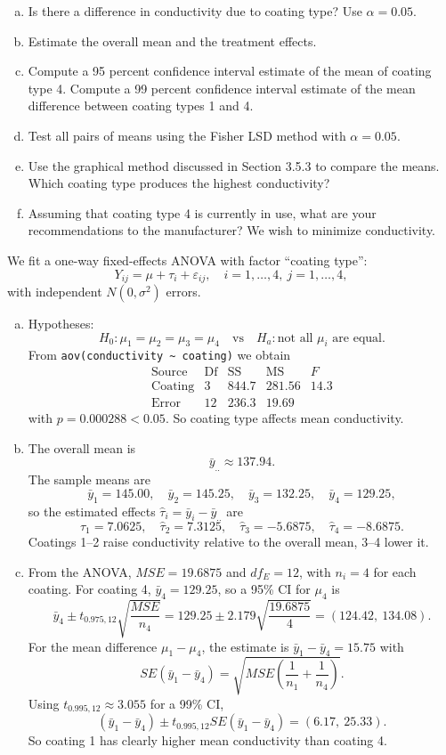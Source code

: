\documentclass[answers,12pt,addpoints]{exam}
\begin{document}
\begin{questions}
\begin{enumerate}[(a)]
\item Is there a difference in conductivity due to coating type? Use $\alpha = 0.05$.
\item Estimate the overall mean and the treatment effects.
\item Compute a 95 percent confidence interval estimate of the mean of coating type 4. Compute a 99 percent confidence interval estimate of the mean difference between coating types 1 and 4.
\item Test all pairs of means using the Fisher LSD method with $\alpha = 0.05$.
\item Use the graphical method discussed in Section 3.5.3 to compare the means. Which coating type produces the highest conductivity?
\item Assuming that coating type 4 is currently in use, what are your recommendations to the manufacturer? We wish to minimize conductivity.
\end{enumerate}

\begin{solution}
We fit a one-way fixed-effects ANOVA with factor “coating type”:
\[
Y_{ij} = \mu + \tau_i + \varepsilon_{ij},\quad i=1,\dots,4,\ j=1,\dots,4,
\]
with independent $N(0,\sigma^2)$ errors.

\begin{enumerate}[(a)]
\item Hypotheses:
\[
H_0:\mu_1=\mu_2=\mu_3=\mu_4
\quad\text{vs}\quad
H_a:\text{not all }\mu_i\text{ are equal}.
\]
From \verb|aov(conductivity ~ coating)| we obtain
\[
\begin{array}{l|rrrr}
\text{Source} & \text{Df} & \text{SS} & \text{MS} & F \\
\hline
\text{Coating} & 3 & 844.7 & 281.56 & 14.3 \\
\text{Error}   & 12& 236.3 & 19.69 &
\end{array}
\]
with $p = 0.000288 < 0.05$. So coating type affects mean conductivity.

\item The overall mean is
\[
\bar y_{..} \approx 137.94.
\]
The sample means are
\[
\bar y_1=145.00,\quad \bar y_2=145.25,\quad \bar y_3=132.25,\quad \bar y_4=129.25,
\]
so the estimated effects $\hat\tau_i = \bar y_i-\bar y_{..}$ are
\[
\hat\tau_1=7.0625,\quad \hat\tau_2=7.3125,\quad \hat\tau_3=-5.6875,\quad \hat\tau_4=-8.6875.
\]
Coatings 1–2 raise conductivity relative to the overall mean, 3–4 lower it.

\item From the ANOVA, $MSE=19.6875$ and $df_E=12$, with $n_i=4$ for each coating.
For coating 4, $\bar y_4=129.25$, so a 95\% CI for $\mu_4$ is
\[
\bar y_4 \pm t_{0.975,12}\sqrt{\frac{MSE}{n_4}}
= 129.25 \pm 2.179\sqrt{\frac{19.6875}{4}}
= (124.42,\ 134.08).
\]
For the mean difference $\mu_1-\mu_4$, the estimate is $\bar y_1-\bar y_4=15.75$ with
\[
SE(\bar y_1-\bar y_4) = \sqrt{MSE\left(\frac{1}{n_1}+\frac{1}{n_4}\right)}.
\]
Using $t_{0.995,12}\approx 3.055$ for a 99\% CI,
\[
(\bar y_1-\bar y_4)\pm t_{0.995,12}SE(\bar y_1-\bar y_4)
= (6.17,\ 25.33).
\]
So coating 1 has clearly higher mean conductivity than coating 4.


\end{enumerate}
\end{solution}
\end{questions}
\end{document}
